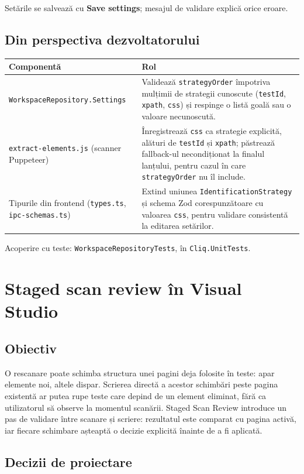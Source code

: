 \documentclass[12pt,a4paper]{report}
\newcommand{\UI}[1]{\textbf{#1}}
\newcommand{\File}[1]{\nolinkurl{#1}}
\begin{document}
Setările se salvează cu \UI{Save settings}; mesajul de validare explică orice eroare.

\section{Din perspectiva dezvoltatorului}

\begin{tabularx}{\textwidth}{@{}p{5.3cm}Y@{}}
\toprule \textbf{Componentă} & \textbf{Rol} \\
\midrule
\File{WorkspaceRepository.Settings} & Validează \File{strategyOrder} împotriva mulțimii de strategii cunoscute (\File{testId}, \File{xpath}, \File{css}) și respinge o listă goală sau o valoare necunoscută. \\
\File{extract-elements.js} (scanner Puppeteer) & Înregistrează \File{css} ca strategie explicită, alături de \File{testId} și \File{xpath}; păstrează fallback-ul necondiționat la finalul lanțului, pentru cazul în care \File{strategyOrder} nu îl include. \\
Tipurile din frontend (\File{types.ts}, \File{ipc-schemas.ts}) & Extind uniunea \File{IdentificationStrategy} și schema Zod corespunzătoare cu valoarea \File{css}, pentru validare consistentă la editarea setărilor. \\
\bottomrule
\end{tabularx}

Acoperire cu teste: \File{WorkspaceRepositoryTests}, în \File{Cliq.UnitTests}.

\chapter[Staged scan review]{Staged scan review în Visual Studio}

\section{Obiectiv}

O rescanare poate schimba structura unei pagini deja folosite în teste: apar elemente noi, altele dispar. Scrierea directă a acestor schimbări peste pagina existentă ar putea rupe teste care depind de un element eliminat, fără ca utilizatorul să observe la momentul scanării. Staged Scan Review introduce un pas de validare între scanare și scriere: rezultatul este comparat cu pagina activă, iar fiecare schimbare așteaptă o decizie explicită înainte de a fi aplicată.

\section{Decizii de proiectare}
\end{document}
